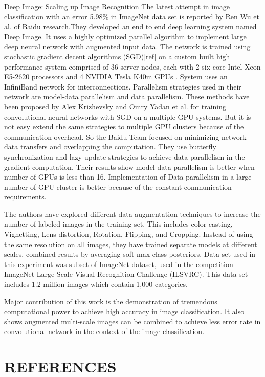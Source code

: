 \documentclass{article}
\begin{document}
\begin{section}{Deep Image: Scaling up Image Recognition}
The latest attempt in image classification with an error 5.98\% in ImageNet data set is reported by  Ren Wu et al.\cite{Wu2015} of Baidu research.They developed an end to end deep learning  system named Deep Image. It uses a highly optimized parallel algorithm  to implement large deep neural network with augmented input data. The network is trained using stochastic gradient decent algorithms (SGD)[ref] on a custom built high performance system comprised of 36 server nodes, each with 2 six-core Intel Xeon E5-2620 processors and 4 NVIDIA Tesla K40m GPUs . System  uses an InfiniBand  network for interconnections. Parallelism strategies used in their network are model-data parallelism and data parallelism.  These methods have been proposed by Alex Krizhevsky \cite{Krizhevsky2014} and Omry Yadan et al.\cite{Yadan2013} for training convolutional neural networks with SGD on a  multiple GPU systems. But it is not easy extend the same strategies to multiple GPU clusters because of the communication overhead. So the  Baidu Team focused on minimizing network data transfers and overlapping the computation. They use butterfly synchronization and lazy update strategies to achieve data parallelism in the gradient computation. Their results show model-data parallelism is better when number of GPUs is less than 16. Implementation of Data parallelism in a large number  of GPU  cluster is better because of the constant communication requirements.
\par
The authors have explored different data augmentation techniques to increase the number of labeled images in the training set. This includes color casting, Vignetting, Lens distortion, Rotation, Flipping, and  Cropping. Instead of using the same resolution on all images, they have trained separate models at different scales, combined results by averaging soft max class posteriors.
Data set used in this experiment was subset of ImageNet dataset, used in the competition ImageNet Large-Scale Visual Recognition Challenge (ILSVRC)\cite{Berg2010}. This data set includes 1.2 million images which contain 1,000 categories.
\par
 Major contribution of this work is the demonstration of tremendous computational power to achieve high accuracy in image classification.
It also shows augmented multi-scale images can be combined to achieve less error rate in convolutional network in the context of the image classification. 
 \end{section}




\section{REFERENCES}
\label{sec:survey}


\end{document}
